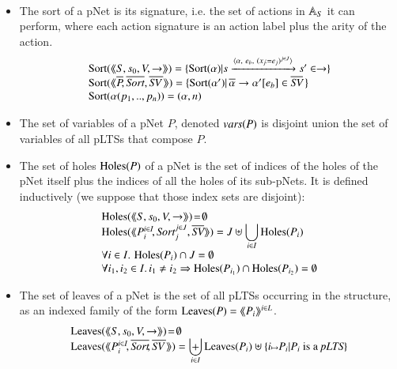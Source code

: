 \documentclass{elsarticle}
\newcommand{\TODO}[1]{\textcolor{red}{\textbf{[TODO:#1]}}}
\begin{document}
\begin{definition}\label{def-sortholeleave}~~

  \begin{itemize}
  \item The sort of a pNet is its signature, i.e. the set of actions in $\mathbb{A}_S$ it can
perform, where each action signature is an action 
label plus the arity of the action.
\[
\begin{array}{l}
\Sortop(\mylangle S,s_0,V, \to\myrangle) = \{\Sortop(\alpha)|s \xrightarrow{\langle \alpha,~e_b,~(x_j\!:= {e}_j)^{j\in
    J}\rangle} s'\in \to \} \\
\Sortop(\mylangle \set{\pNet}\!, %
\set{\Sort},
\set{\symb{SV}\,}\myrangle)
=\{\Sortop(\alpha') |\, \SV{\set{\alpha}}{\alpha'}{e_b}\in\set{\symb{SV}}\,\}\\
\Sortop(\alpha(p_1,..,p_n))=(\alpha,n)
\end{array}
\]

\item The set of variables of a pNet $P$, denoted $\vars(P)$ is disjoint union the set of variables of  all pLTSs that compose $P$.

\item
The set of holes $\operatorname{Holes}(P)$ of a pNet is the set of indices of the holes of the pNet 
itself plus the indices of all the holes of its sub-pNets.
It is defined inductively (we suppose that those index sets are
disjoint):
  \[\begin{array}{l}
\Holes(\mylangle S,s_0,V, \to\myrangle) \!=\! \emptyset\\
\Holes(\mylangle \pNet_i^{i\in I}\!,\Sort_j^{j\in J}, \set{\symb{SV}}\myrangle) 
=J\uplus{\displaystyle \bigcup_{i\in 
I}\Holes(\pNet_i)}\\
\forall i\in I.\, \Holes(\pNet_i)\cap J=\emptyset\\
\forall i_1,i_2\in I.\,i_1\neq i_2\Rightarrow  \Holes(\pNet_{i_1})\cap\Holes(\pNet_{i_2})=\emptyset
\end{array}\]

\item
The set of leaves of a pNet is the set of all pLTSs occurring in the structure, as an 
indexed family of the form $\operatorname{Leaves}(P)= \langle\hspace{-0.45ex}\langle P_i \rangle\hspace{-0.45ex}\rangle^{i \in L}$.
\[\begin{array}{l}
\Leaves(\mylangle S,s_0,V, \to\myrangle) \!=\!\emptyset\\%
\Leaves(\mylangle \pNet_i^{i\in I}\!,%
\set{\Sort}\!, \set{\symb{SV}\,}\myrangle) = {\displaystyle \biguplus_{i\in 
I}\Leaves(\pNet_i)\uplus\{i\mapsto \pNet_i|\pNet_i \text{ is a }\pLTS\}}
\end{array}\]
\end{itemize}


\end{definition}
\end{document}
